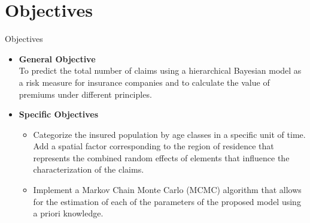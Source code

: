 \documentclass[10pt]{beamer} %
\begin{document}

\section{Objectives}
\begin{frame}{Objectives}
\begin{itemize}
    \item \textbf{General Objective}\\
    To predict the total number of claims using a hierarchical Bayesian model as a risk measure for insurance companies and to calculate the value of premiums under different principles.\\
    \item\textbf{Specific Objectives}
    \begin{itemize}
        \item Categorize the insured population by age classes in a specific unit of time. Add a spatial factor corresponding to the region of residence that represents the combined random effects of elements that influence the characterization of the claims.
	\item Implement a Markov Chain Monte Carlo (MCMC) algorithm that allows for the estimation of each of the parameters of the proposed model using a priori knowledge.
    \end{itemize}
\end{itemize}
\end{frame}
\end{document}
